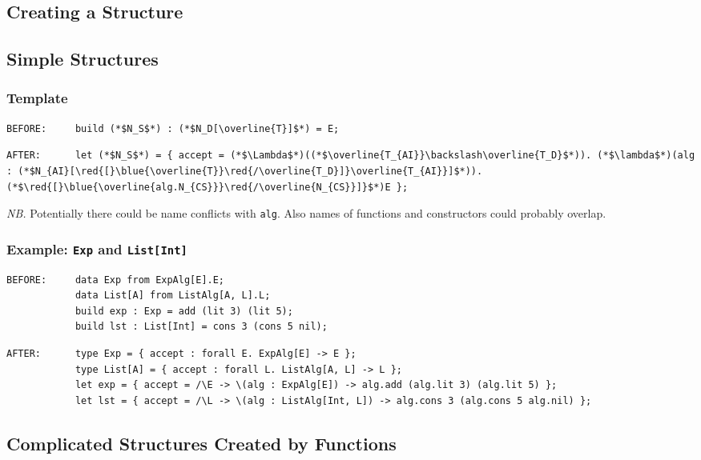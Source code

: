 \documentclass{article}
\newcommand{\red}[1]{\textcolor{red}{#1}}
\newcommand{\blue}[1]{\textcolor{blue}{#1}}
\newcommand{\nb}{\textit{NB. }}
\begin{document}
\begin{spacing}{1.1}
\section{Creating a Structure}

\subsection{Simple Structures}

\subsubsection{Template}

\begin{lstlisting}[numbers=none]
BEFORE:     build (*$N_S$*) : (*$N_D[\overline{T}]$*) = E;
\end{lstlisting}
\begin{lstlisting}[numbers=none]
AFTER:      let (*$N_S$*) = { accept = (*$\Lambda$*)((*$\overline{T_{AI}}\backslash\overline{T_D}$*)). (*$\lambda$*)(alg : (*$N_{AI}[\red{[}\blue{\overline{T}}\red{/\overline{T_D}]}\overline{T_{AI}}]$*)). (*$\red{[}\blue{\overline{alg.N_{CS}}}\red{/\overline{N_{CS}}]}$*)E };
\end{lstlisting}

\nb Potentially there could be name conflicts with \lstinline{alg}. Also names of functions and constructors could probably overlap.

\subsubsection{Example: \lstinline{Exp} and \lstinline{List[Int]}}

\begin{lstlisting}[numbers=none]
BEFORE:     data Exp from ExpAlg[E].E;
            data List[A] from ListAlg[A, L].L;
            build exp : Exp = add (lit 3) (lit 5);
            build lst : List[Int] = cons 3 (cons 5 nil);
\end{lstlisting}
\begin{lstlisting}[numbers=none]
AFTER:      type Exp = { accept : forall E. ExpAlg[E] -> E };
            type List[A] = { accept : forall L. ListAlg[A, L] -> L };
            let exp = { accept = /\E -> \(alg : ExpAlg[E]) -> alg.add (alg.lit 3) (alg.lit 5) };
            let lst = { accept = /\L -> \(alg : ListAlg[Int, L]) -> alg.cons 3 (alg.cons 5 alg.nil) };
\end{lstlisting}

\subsection{Complicated Structures Created by Functions}


\end{spacing}
\end{document}
